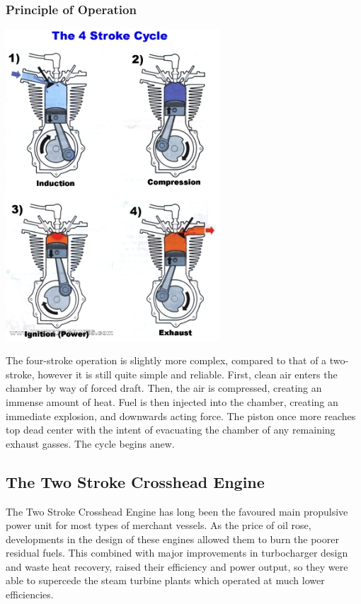 \documentclass[11pt,a4paper]{article}
\begin{document}
\subsubsection{Principle of Operation}
\begin{center}
\includegraphics[width=8cm]{4stroke.jpg}
\end{center}
The four-stroke operation is slightly more complex, compared to that of a two-stroke, however it is still quite simple and reliable. First, clean air enters the chamber by way of forced draft. Then, the air is compressed, creating an immense amount of heat. Fuel is then injected into the chamber, creating an immediate explosion, and downwards acting force. The piston once more reaches top dead center with the intent of evacuating the chamber of any remaining exhaust gasses. The cycle begins anew.

\subsection{The Two Stroke Crosshead Engine}
The Two Stroke Crosshead Engine has long been the favoured main propulsive power unit for most types of merchant vessels. As the price of oil rose, developments in the design of these engines allowed them to burn the poorer residual fuels. This combined with major improvements in turbocharger design and waste heat recovery, raised their efficiency and power output, so they were able to supercede the steam turbine plants which operated at much lower efficiencies.
\end{document}
